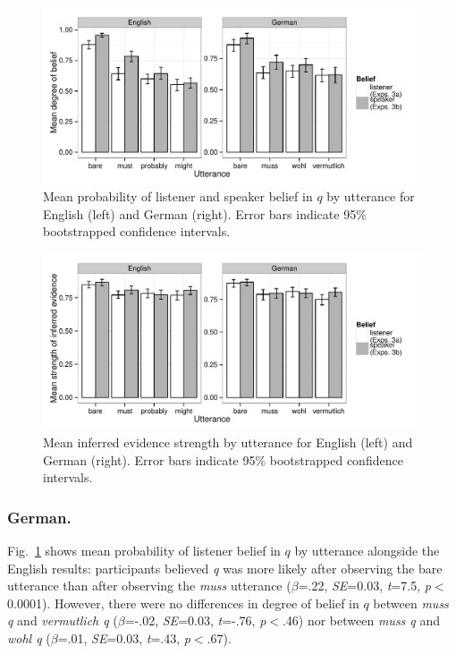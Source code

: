 \documentclass[11pt]{article}
\begin{document}
\begin{figure}
	\centering
	\includegraphics[width=\textwidth]{pics/mean-beliefs}
	\caption{Mean probability of listener and speaker belief in $q$ by utterance for English (left) and German (right). Error bars indicate 95\% bootstrapped confidence intervals.}
	\label{fig:expt3}
\end{figure}

\begin{figure}
	\centering
	\includegraphics[width=\textwidth]{pics/mean-evidence}
	\caption{Mean inferred evidence strength by utterance for English (left) and German (right). Error bars indicate 95\% bootstrapped confidence intervals.}
	\label{fig:exp3-evidence}
\end{figure}

\subsubsection{German.} Fig.~\ref{fig:expt3} shows mean probability of listener belief in $q$ by utterance alongside the English results: participants believed \emph{q} was more likely after observing the bare utterance than after observing the \emph{muss} utterance   ($\beta$=.22, \emph{SE}=0.03, \emph{t}=7.5, \emph{p}$<$0.0001). However, there were no differences in degree of belief in $q$ between \emph{muss q} and \emph{vermutlich q} ($\beta$=-.02, \emph{SE}=0.03, \emph{t}=-.76, \emph{p}$<$.46) nor between \emph{muss q} and \emph{wohl q} ($\beta$=.01, \emph{SE}=0.03, \emph{t}=.43, \emph{p}$<$.67). 
\end{document}
